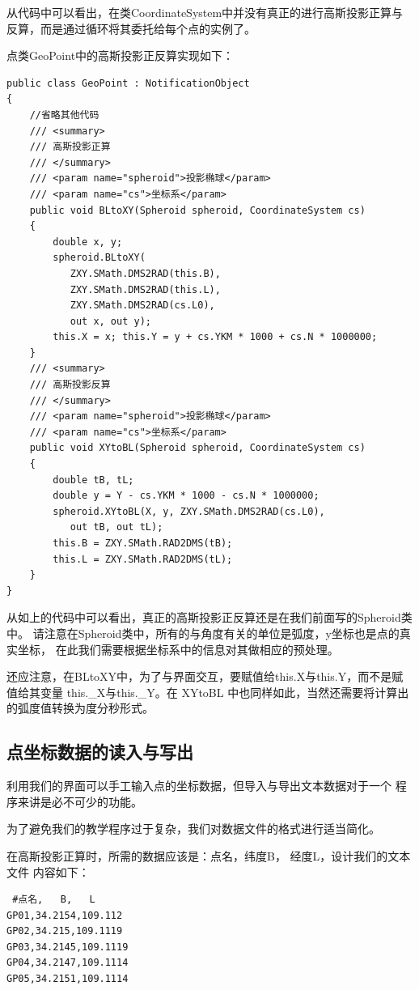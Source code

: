 从代码中可以看出，在类CoordinateSystem中并没有真正的进行高斯投影正算与
反算，而是通过循环将其委托给每个点的实例了。

点类GeoPoint中的高斯投影正反算实现如下：

\begin{lstlisting}
public class GeoPoint : NotificationObject
{
    //省略其他代码
    /// <summary>
    /// 高斯投影正算
    /// </summary>
    /// <param name="spheroid">投影椭球</param>
    /// <param name="cs">坐标系</param>
    public void BLtoXY(Spheroid spheroid, CoordinateSystem cs)
    {
        double x, y;
        spheroid.BLtoXY(
           ZXY.SMath.DMS2RAD(this.B),
           ZXY.SMath.DMS2RAD(this.L),
           ZXY.SMath.DMS2RAD(cs.L0),
           out x, out y);
        this.X = x; this.Y = y + cs.YKM * 1000 + cs.N * 1000000;
    }
    /// <summary>
    /// 高斯投影反算
    /// </summary>
    /// <param name="spheroid">投影椭球</param>
    /// <param name="cs">坐标系</param>
    public void XYtoBL(Spheroid spheroid, CoordinateSystem cs)
    {
        double tB, tL;
        double y = Y - cs.YKM * 1000 - cs.N * 1000000;
        spheroid.XYtoBL(X, y, ZXY.SMath.DMS2RAD(cs.L0),
           out tB, out tL);
        this.B = ZXY.SMath.RAD2DMS(tB);
        this.L = ZXY.SMath.RAD2DMS(tL);
    }
}
\end{lstlisting}

从如上的代码中可以看出，真正的高斯投影正反算还是在我们前面写的Spheroid类中。
请注意在Spheroid类中，所有的与角度有关的单位是弧度，y坐标也是点的真实坐标，
在此我们需要根据坐标系中的信息对其做相应的预处理。

还应注意，在BLtoXY中，为了与界面交互，要赋值给this.X与this.Y，而不是赋值给其变量
this.\_X与this.\_Y。在 XYtoBL 中也同样如此，当然还需要将计算出的弧度值转换为度分秒形式。

\subsection{点坐标数据的读入与写出}

利用我们的界面可以手工输入点的坐标数据，但导入与导出文本数据对于一个
程序来讲是必不可少的功能。

为了避免我们的教学程序过于复杂，我们对数据文件的格式进行适当简化。

在高斯投影正算时，所需的数据应该是：点名，纬度B， 经度L，设计我们的文本文件
内容如下：

\begin{verbatim}
 #点名,   B,   L
GP01,34.2154,109.112
GP02,34.215,109.1119
GP03,34.2145,109.1119
GP04,34.2147,109.1114
GP05,34.2151,109.1114
\end{verbatim}


